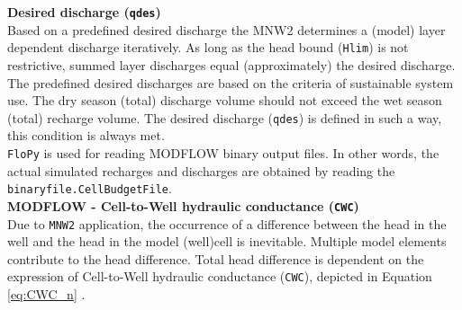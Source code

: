 \textbf{Desired discharge (\texttt{qdes})} \\
Based on a predefined desired discharge the MNW2 determines a (model) layer dependent discharge iteratively. As long as the head bound (\texttt{Hlim}) is not restrictive, summed layer discharges equal (approximately) the desired discharge. The predefined desired discharges are based on the criteria of sustainable system use. The dry season (total) discharge volume should not exceed the wet season (total) recharge volume. The desired discharge (\texttt{qdes}) is defined in such a way, this condition is always met. \\
%
%
%
%

\texttt{FloPy} is used for reading MODFLOW binary output files. In other words, the actual simulated recharges and discharges are obtained by reading the \texttt{binaryfile.CellBudgetFile}. \\

\textbf{MODFLOW - Cell-to-Well hydraulic conductance (\texttt{CWC})} \\
Due to \texttt{MNW2} application, the occurrence of a difference between the head in the well and the head in the model (well)cell is inevitable. Multiple model elements contribute to the head difference. Total head difference is dependent on the expression of Cell-to-Well hydraulic conductance (\texttt{CWC}), depicted in Equation \ref{eq:CWC_n} \citep{LeonardF.KonikowGeorgeZ.HornbergerKeithJ.Halford2009}. 

